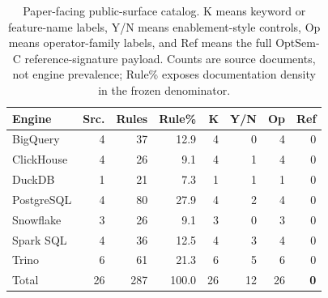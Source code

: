 \begin{table}[t]
\centering
\caption{Paper-facing public-surface catalog. K means keyword or feature-name labels, Y/N means enablement-style controls, Op means operator-family labels, and Ref means the full OptSem-C reference-signature payload. Counts are source documents, not engine prevalence; Rule\% exposes documentation density in the frozen denominator.}
\label{tab:projection-surface-portfolio}
\footnotesize
\setlength{\tabcolsep}{1.8pt}
\begin{tabular}{@{}lrrrrrrr@{}}
\toprule
Engine & Src. & Rules & Rule\% & K & Y/N & Op & Ref \\
\midrule
BigQuery & 4 & 37 & 12.9 & 4 & 0 & 4 & 0 \\
ClickHouse & 4 & 26 & 9.1 & 4 & 1 & 4 & 0 \\
DuckDB & 1 & 21 & 7.3 & 1 & 1 & 1 & 0 \\
PostgreSQL & 4 & 80 & 27.9 & 4 & 2 & 4 & 0 \\
Snowflake & 3 & 26 & 9.1 & 3 & 0 & 3 & 0 \\
Spark SQL & 4 & 36 & 12.5 & 4 & 3 & 4 & 0 \\
Trino & 6 & 61 & 21.3 & 6 & 5 & 6 & 0 \\
\midrule
Total & 26 & 287 & 100.0 & 26 & 12 & 26 & \textbf{0} \\
\bottomrule
\end{tabular}
\end{table}
